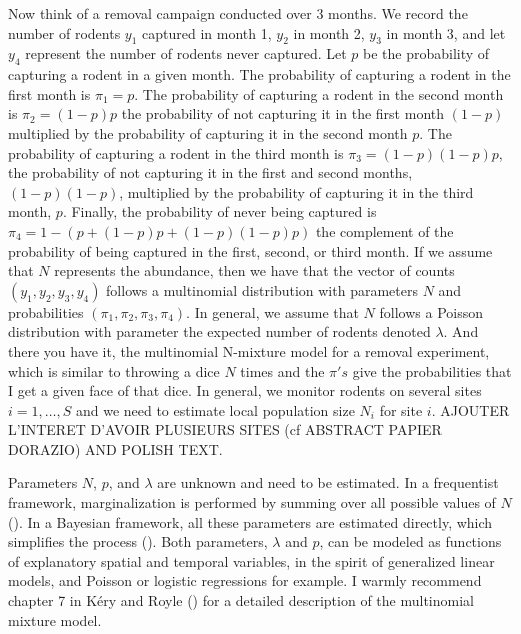 \documentclass[
  11pt,
  a4paper,
]{article}
\begin{document}
Now think of a removal campaign conducted over 3 months. We record the number of rodents \(y_1\) captured in month 1, \(y_2\) in month 2, \(y_3\) in month 3, and let \(y_4\) represent the number of rodents never captured. Let \(p\) be the probability of capturing a rodent in a given month. The probability of capturing a rodent in the first month is \(\pi_1 = p\). The probability of capturing a rodent in the second month is \(\pi_2 = (1-p)p\) the probability of not capturing it in the first month \((1 - p)\) multiplied by the probability of capturing it in the second month \(p\). The probability of capturing a rodent in the third month is \(\pi_3 = (1-p)(1-p)p\), the probability of not capturing it in the first and second months, \((1 - p)(1 - p)\), multiplied by the probability of capturing it in the third month, \(p\). Finally, the probability of never being captured is \(\pi_4 = 1 - (p + (1-p)p + (1-p)(1-p)p)\) the complement of the probability of being captured in the first, second, or third month. If we assume that \(N\) represents the abundance, then we have that the vector of counts \((y_1, y_2, y_3, y_4)\) follows a multinomial distribution with parameters \(N\) and probabilities \((\pi_1,\pi_2,\pi_3,\pi_4)\). In general, we assume that \(N\) follows a Poisson distribution with parameter the expected number of rodents denoted \(\lambda\). And there you have it, the multinomial N-mixture model for a removal experiment, which is similar to throwing a dice \(N\) times and the \(\pi's\) give the probabilities that I get a given face of that dice. In general, we monitor rodents on several sites \(i = 1,\ldots,S\) and we need to estimate local population size \(N_i\) for site \(i\). AJOUTER L'INTERET D'AVOIR PLUSIEURS SITES (cf ABSTRACT PAPIER DORAZIO) AND POLISH TEXT.

Parameters \(N\), \(p\), and \(\lambda\) are unknown and need to be estimated. In a frequentist framework, marginalization is performed by summing over all possible values of \(N\) (). In a Bayesian framework, all these parameters are estimated directly, which simplifies the process (). Both parameters, \(\lambda\) and \(p\), can be modeled as functions of explanatory spatial and temporal variables, in the spirit of generalized linear models, and Poisson or logistic regressions for example. I warmly recommend chapter 7 in Kéry and Royle () for a detailed description of the multinomial mixture model.
\end{document}

